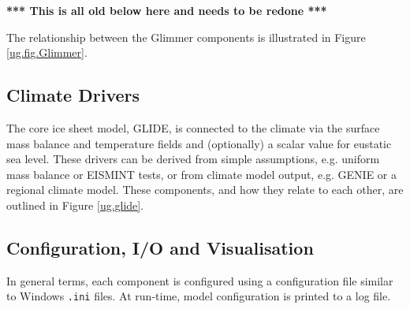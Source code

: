 \begin{itemize}
\end{itemize}
%
\textbf{*** This is all old below here and needs to be redone ***}

The relationship between the Glimmer components is illustrated in Figure \ref{ug.fig.Glimmer}. 
%
\subsection{Climate Drivers}
\label{subsec:climdrive}
The core ice sheet model, GLIDE, is connected to the climate via the surface mass balance and temperature fields and (optionally) a scalar value for eustatic sea level. These drivers can be derived from simple assumptions, e.g. uniform mass balance or EISMINT tests, or from climate model output, e.g. GENIE or a regional climate model. These components, and how they relate to each other, are outlined in Figure \ref{ug.glide}.
%
%
\subsection{Configuration, I/O and Visualisation}
In general terms, each component is configured using a configuration file similar to Windows \texttt{.ini} files. At run-time, model configuration is printed to a log file. 

